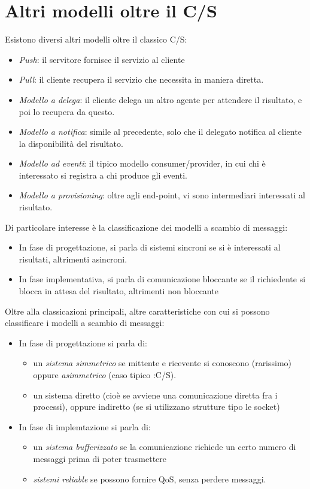 \section{Altri modelli oltre il C/S}
Esistono diversi altri modelli oltre il classico C/S:
\begin{itemize}
 \item \textit{Push}: il servitore fornisce il servizio al cliente
 \item \textit{Pull}: il cliente recupera il servizio che necessita in maniera diretta.
 \item \textit{Modello a delega}: il cliente delega un altro agente per attendere il risultato, e poi lo recupera da
 questo.
 \item \textit{Modello a notifica}: simile al precedente, solo che il delegato notifica al cliente la disponibilità
 del risultato.
 \item \textit{Modello ad eventi}: il tipico modello consumer/provider, in cui chi è interessato si registra a chi
 produce gli eventi.
 \item \textit{Modello a provisioning}: oltre agli end-point, vi sono intermediari interessati al risultato.
\end{itemize}
Di particolare interesse è la classificazione dei modelli a scambio di messaggi:
\begin{itemize}
 \item In fase di progettazione, si parla di sistemi sincroni se si è interessati al risultati, altrimenti asincroni.
 \item In fase implementativa, si parla di comunicazione bloccante se il richiedente si blocca in attesa del risultato,
 altrimenti non bloccante
\end{itemize}
Oltre alla classicazioni principali, altre caratteristiche con cui si possono classificare i modelli a scambio di
messaggi:
\begin{itemize}
 \item In fase di progettazione si parla di:
 \begin{itemize}
  \item un \textit{sistema simmetrico} se mittente e ricevente si conoscono
  (rarissimo) oppure \textit{asimmetrico} (caso tipico :C/S).
  \item un sistema diretto (cioè se avviene una comunicazione diretta fra i
  processi), oppure indiretto (se si utilizzano strutture tipo le socket)
 \end{itemize}
 \item In fase di implemtazione si parla di:
 \begin{itemize}
  \item un \textit{sistema bufferizzato} se la comunicazione richiede un certo
  numero di messaggi prima di poter trasmettere
  \item \textit{sistemi reliable} se possono fornire QoS, senza perdere
  messaggi.
 \end{itemize}
\end{itemize}

